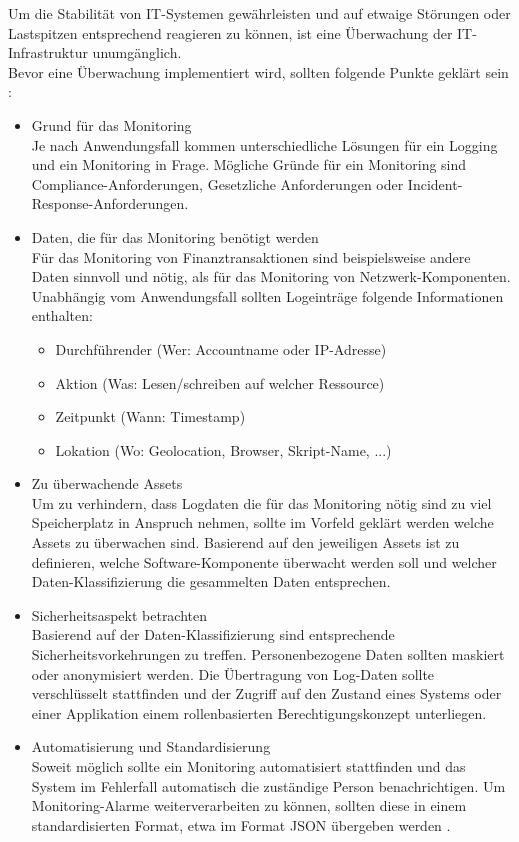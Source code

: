 \bigbreak
Um die Stabilität von IT-Systemen gewährleisten und auf etwaige Störungen oder Lastspitzen entsprechend reagieren zu können, ist eine Überwachung der IT-Infrastruktur unumgänglich. \\
Bevor eine Überwachung implementiert wird, sollten folgende Punkte geklärt sein \autocite{ashutosh_nivedita_2022}:
\begin{itemize}
    \item Grund für das Monitoring\\
    Je nach Anwendungsfall kommen unterschiedliche Lösungen für ein Logging und ein Monitoring in Frage. Mögliche Gründe für ein Monitoring sind Compliance-Anforderungen, Gesetzliche Anforderungen oder Incident-Response-Anforderungen. 
    \item Daten, die für das Monitoring benötigt werden\\
    Für das Monitoring von Finanztransaktionen sind beispielsweise andere Daten sinnvoll und nötig, als für das Monitoring von Netzwerk-Komponenten. Unabhängig vom Anwendungsfall sollten Logeinträge folgende Informationen enthalten:
    \begin{itemize}
        \item Durchführender (Wer: Accountname oder IP-Adresse)
        \item Aktion (Was: Lesen/schreiben auf welcher Ressource)
        \item Zeitpunkt (Wann: Timestamp)
        \item Lokation (Wo: Geolocation, Browser, Skript-Name, ...)
    \end{itemize}
    \item Zu überwachende Assets\\
    Um zu verhindern, dass Logdaten die für das Monitoring nötig sind zu viel Speicherplatz in Anspruch nehmen, sollte im Vorfeld geklärt werden welche Assets zu überwachen sind. Basierend auf den jeweiligen Assets ist zu definieren, welche Software-Komponente überwacht werden soll und welcher Daten-Klassifizierung die gesammelten Daten entsprechen.
    \item Sicherheitsaspekt betrachten\\
    Basierend auf der Daten-Klassifizierung sind entsprechende Sicherheitsvorkehrungen zu treffen. Personenbezogene Daten sollten maskiert oder anonymisiert werden. Die Übertragung von Log-Daten sollte verschlüsselt stattfinden und der Zugriff auf den Zustand eines Systems oder einer Applikation einem rollenbasierten Berechtigungskonzept unterliegen.
    \item Automatisierung und Standardisierung\\
    Soweit möglich sollte ein Monitoring automatisiert stattfinden und das System im Fehlerfall automatisch die zuständige Person benachrichtigen. Um Monitoring-Alarme weiterverarbeiten zu können, sollten diese in einem standardisierten Format, etwa im Format \glqq{}JSON\grqq{} übergeben werden \autocite{JSON}.  
\end{itemize}

